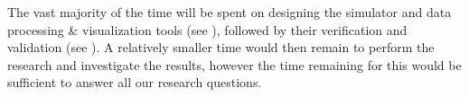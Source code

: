 The vast majority of the time will be spent on designing the simulator and data processing \& visualization tools (see ), followed by their verification and validation (see ). A relatively smaller time would then remain to perform the research and investigate the results, however the time remaining for this would be sufficient to answer all our research questions.
